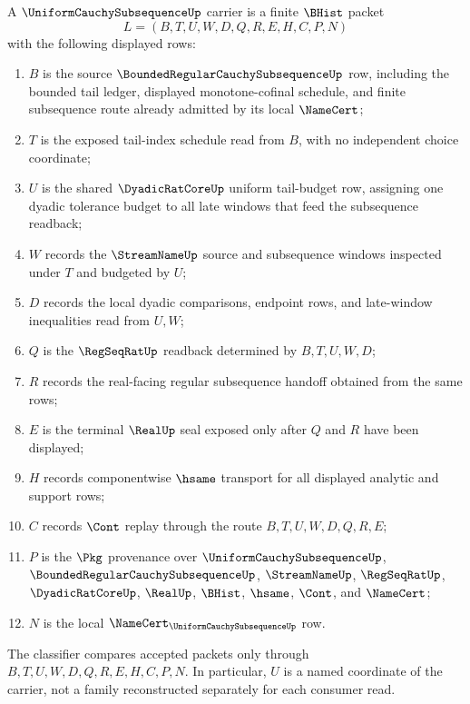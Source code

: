 \begin{definition}
\label{def:uniform-cauchy-subsequence-carrier}
A $\UniformCauchySubsequenceUp$ carrier is a finite $\BHist$ packet
$$
L=(B,T,U,W,D,Q,R,E,H,C,P,N)
$$
with the following displayed rows:
\begin{enumerate}
\item $B$ is the source $\BoundedRegularCauchySubsequenceUp$ row, including the bounded tail ledger, displayed monotone-cofinal schedule, and finite subsequence route already admitted by its local $\NameCert$;
\item $T$ is the exposed tail-index schedule read from $B$, with no independent choice coordinate;
\item $U$ is the shared $\DyadicRatCoreUp$ uniform tail-budget row, assigning one dyadic tolerance budget to all late windows that feed the subsequence readback;
\item $W$ records the $\StreamNameUp$ source and subsequence windows inspected under $T$ and budgeted by $U$;
\item $D$ records the local dyadic comparisons, endpoint rows, and late-window inequalities read from $U,W$;
\item $Q$ is the $\RegSeqRatUp$ readback determined by $B,T,U,W,D$;
\item $R$ records the real-facing regular subsequence handoff obtained from the same rows;
\item $E$ is the terminal $\RealUp$ seal exposed only after $Q$ and $R$ have been displayed;
\item $H$ records componentwise $\hsame$ transport for all displayed analytic and support rows;
\item $C$ records $\Cont$ replay through the route $B,T,U,W,D,Q,R,E$;
\item $P$ is the $\Pkg$ provenance over $\UniformCauchySubsequenceUp$, $\BoundedRegularCauchySubsequenceUp$, $\StreamNameUp$, $\RegSeqRatUp$, $\DyadicRatCoreUp$, $\RealUp$, $\BHist$, $\hsame$, $\Cont$, and $\NameCert$;
\item $N$ is the local $\NameCert_{\UniformCauchySubsequenceUp}$ row.
\end{enumerate}
The classifier compares accepted packets only through $B,T,U,W,D,Q,R,E,H,C,P,N$. In particular, $U$ is a named coordinate of the carrier, not a family reconstructed separately for each consumer read.
\end{definition}

